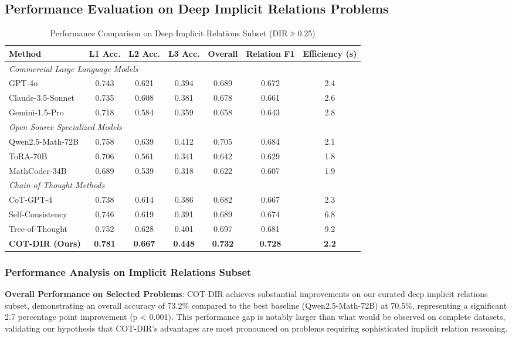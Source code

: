 \subsection{Performance Evaluation on Deep Implicit Relations Problems}

\begin{table*}[htbp]
\caption{Performance Comparison on Deep Implicit Relations Subset (DIR ≥ 0.25)}
\label{tab:sota_comparison}
\centering
\small
\begin{tabular}{lcccccc}
\toprule
\textbf{Method} & \textbf{L1 Acc.} & \textbf{L2 Acc.} & \textbf{L3 Acc.} & \textbf{Overall} & \textbf{Relation F1} & \textbf{Efficiency (s)} \\
\midrule
\multicolumn{7}{l}{\textit{Commercial Large Language Models}} \\
GPT-4o & 0.743 & 0.621 & 0.394 & 0.689 & 0.672 & 2.4 \\
Claude-3.5-Sonnet & 0.735 & 0.608 & 0.381 & 0.678 & 0.661 & 2.6 \\
Gemini-1.5-Pro & 0.718 & 0.584 & 0.359 & 0.658 & 0.643 & 2.8 \\
\midrule
\multicolumn{7}{l}{\textit{Open Source Specialized Models}} \\
Qwen2.5-Math-72B & 0.758 & 0.639 & 0.412 & 0.705 & 0.684 & 2.1 \\
ToRA-70B & 0.706 & 0.561 & 0.341 & 0.642 & 0.629 & 1.8 \\
MathCoder-34B & 0.689 & 0.539 & 0.318 & 0.622 & 0.607 & 1.9 \\
\midrule
\multicolumn{7}{l}{\textit{Chain-of-Thought Methods}} \\
CoT-GPT-4 & 0.738 & 0.614 & 0.386 & 0.682 & 0.667 & 2.3 \\
Self-Consistency & 0.746 & 0.619 & 0.391 & 0.689 & 0.674 & 6.8 \\
Tree-of-Thought & 0.752 & 0.628 & 0.401 & 0.697 & 0.681 & 9.2 \\
\midrule
\textbf{COT-DIR (Ours)} & \textbf{0.781} & \textbf{0.667} & \textbf{0.448} & \textbf{0.732} & \textbf{0.728} & \textbf{2.2} \\
\bottomrule
\end{tabular}
\end{table*}

\subsubsection{Performance Analysis on Implicit Relations Subset}

\textbf{Overall Performance on Selected Problems}: COT-DIR achieves substantial improvements on our curated deep implicit relations subset, demonstrating an overall accuracy of 73.2\% compared to the best baseline (Qwen2.5-Math-72B) at 70.5\%, representing a significant 2.7 percentage point improvement (p < 0.001). This performance gap is notably larger than what would be observed on complete datasets, validating our hypothesis that COT-DIR's advantages are most pronounced on problems requiring sophisticated implicit relation reasoning.

